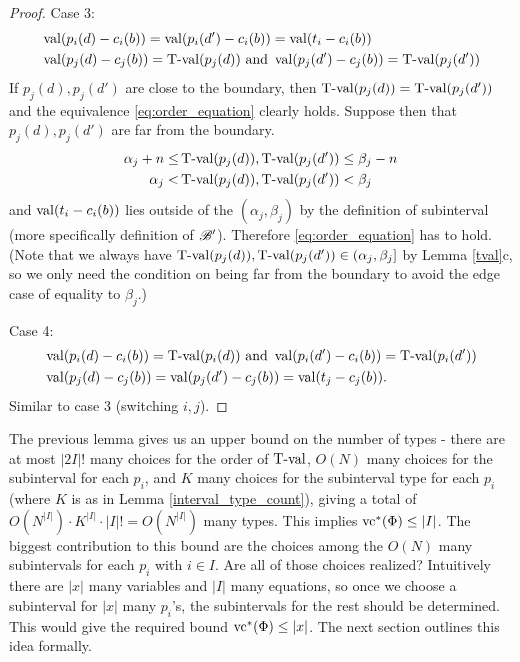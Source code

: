 \documentclass{amsart}
\begin{document}
\begin{proof}
 Case 3:
  \begin{align*}
    &\operatorname{val} (p_i(d) - c_i(b)) = \operatorname{val} (p_i(d') - c_i(b)) = \operatorname{val}(t_i - c_i(b)) \\
    &\operatorname{val} (p_j(d) - c_j(b)) = \operatorname{T-val}(p_j(d)) \text{ and } \operatorname{val} (p_j(d') - c_j(b)) = \operatorname{T-val}(p_j(d'))
  \end{align*}
  If $p_j(d), p_j(d')$ are close to the boundary,
  then $\operatorname{T-val}(p_j(d)) = \operatorname{T-val}(p_j(d'))$ and the equivalence \eqref{eq:order_equation} clearly holds.
  Suppose then that $p_j(d), p_j(d')$ are far from the boundary.
  \begin{align*}
    \alpha_j + n \leq &\operatorname{T-val}(p_j(d)), \operatorname{T-val}(p_j(d')) \leq \beta_j - n \\
    \alpha_j < &\operatorname{T-val}(p_j(d)), \operatorname{T-val}(p_j(d')) < \beta_j
  \end{align*}
  and $\operatorname{val}(t_i - c_i(b))$ lies outside of the $(\alpha_j, \beta_j)$
  by the definition of subinterval (more specifically definition of $\mathscr B'$).
  Therefore \eqref{eq:order_equation} has to hold.
  (Note that we always have $\operatorname{T-val}(p_j(d)), \operatorname{T-val}(p_j(d')) \in (\alpha_j, \beta_j]$ by Lemma \ref{tval}c, so 
  we only need the condition on being far from the boundary to avoid the edge case of equality to $\beta_j$.)

  Case 4:
  \begin{align*}
    &\operatorname{val} (p_i(d) - c_i(b)) = \operatorname{T-val}(p_i(d)) \text{ and } \operatorname{val} (p_i(d') - c_i(b)) = \operatorname{T-val}(p_i(d')) \\
    &\operatorname{val} (p_j(d) - c_j(b)) = \operatorname{val} (p_j(d') - c_j(b)) = \operatorname{val}(t_j - c_j(b)).
  \end{align*}
  Similar to case 3 (switching $i,j$).
\end{proof}



  The previous lemma gives us an upper bound on the number of types - there are at most $|2I|!$ many choices for the order of $\operatorname{T-val}$,
  $O(N)$ many choices for the subinterval for each $p_i$,
  and $K$ many choices for the subinterval type for each $p_i$ (where $K$ is as in Lemma \ref{interval_type_count}),
  giving a total of $O(N^{|I|}) \cdot K^{|I|} \cdot |I|! = O(N^{|I|})$ many types.
  This implies $\operatorname{vc}^*(\Phi) \leq |I|$.
  The biggest contribution to this bound are the choices among the $O(N)$ many subintervals for each $p_i$ with $i \in I$.
  Are all of those choices realized?
  Intuitively there are $|x|$ many variables and $|I|$ many equations,
  so once we choose a subinterval for $|x|$ many $p_i$'s, the subintervals for the rest should be determined.
  This would give the required bound $\operatorname{vc}^*(\Phi) \leq |x|$.
  The next section outlines this idea formally.
\end{document}
